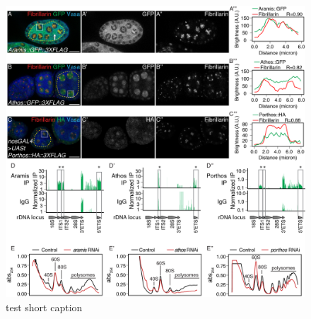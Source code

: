 \documentclass[12pt,oneside]{reedthesis}
\begin{document}
\begin{figure}

{\centering \includegraphics[width=6.5 in,height=8.9375 in]{./figure/Ribosome Biogenesis/Ribosome Biogenesis 2} 

}

\caption[test short caption]{test short caption}\label{fig:unnamed-chunk-8}
\end{figure}
\end{document}
